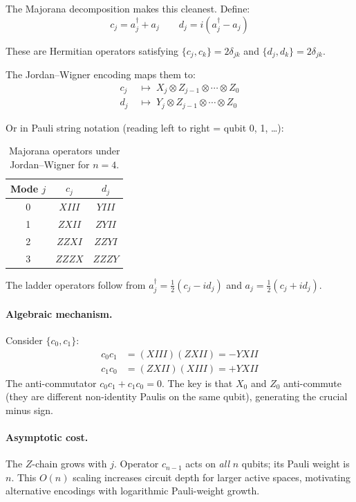 \documentclass[aps,prb,preprint,longbibliography,nofootinbib]{revtex4-2}
\begin{document}
The Majorana decomposition makes this cleanest.  Define:
\begin{equation}
c_j = a^\dagger_j + a_j \qquad d_j = i(a^\dagger_j - a_j)
\end{equation}

These are Hermitian operators satisfying
$\{c_j, c_k\} = 2\delta_{jk}$ and $\{d_j, d_k\} = 2\delta_{jk}$.

The Jordan--Wigner encoding maps them to:
\begin{align}
c_j &\;\mapsto\; X_j \otimes Z_{j-1} \otimes \cdots \otimes Z_0 \\
d_j &\;\mapsto\; Y_j \otimes Z_{j-1} \otimes \cdots \otimes Z_0
\end{align}

Or in Pauli string notation (reading left to right = qubit 0, 1, \ldots):

\begin{table}[h]
\centering
\begin{tabular}{@{}ccc@{}}
\toprule
\textbf{Mode} $j$ & $c_j$ & $d_j$ \\
\midrule
0 & $XIII$ & $YIII$ \\
1 & $ZXII$ & $ZYII$ \\
2 & $ZZXI$ & $ZZYI$ \\
3 & $ZZZX$ & $ZZZY$ \\
\bottomrule
\end{tabular}
\caption{Majorana operators under Jordan--Wigner for $n=4$.}
\label{tab:jw-majorana}
\end{table}

The ladder operators follow from
$a^\dagger_j = \frac{1}{2}(c_j - id_j)$ and
$a_j = \frac{1}{2}(c_j + id_j)$.

\paragraph{Algebraic mechanism.}
Consider $\{c_0, c_1\}$:
\begin{align}
c_0 c_1 &= (XIII)(ZXII) = -YXII \\
c_1 c_0 &= (ZXII)(XIII) = +YXII
\end{align}
The anti-commutator $c_0 c_1 + c_1 c_0 = 0$.  The key is that $X_0$
and $Z_0$ anti-commute (they are different non-identity Paulis on the
same qubit), generating the crucial minus sign.

\paragraph{Asymptotic cost.}
The $Z$-chain grows with $j$.  Operator $c_{n-1}$ acts on \emph{all}
$n$ qubits; its Pauli weight is $n$.  This $O(n)$ scaling increases
circuit depth for larger active spaces, motivating alternative
encodings with logarithmic Pauli-weight growth.
\end{document}
